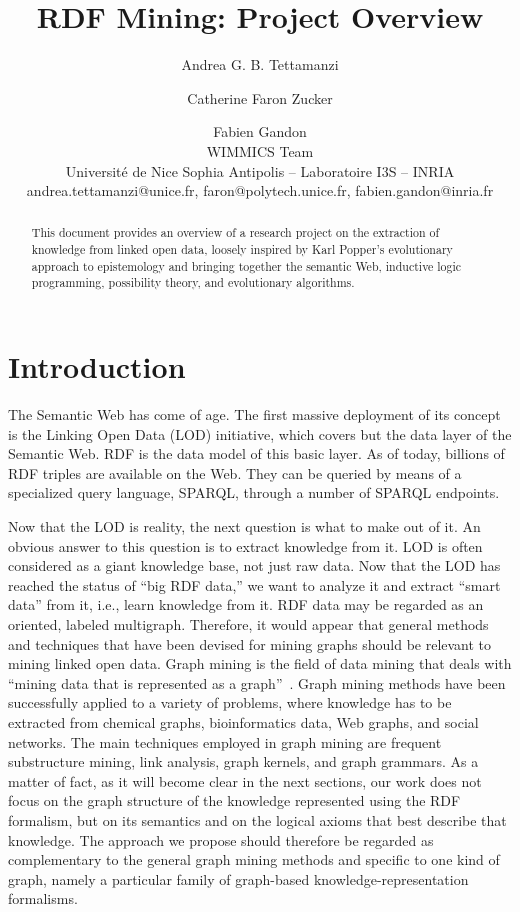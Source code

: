 \documentclass[a4paper]{article}
\title{RDF Mining: Project Overview}
\author{Andrea G. B. Tettamanzi \and Catherine Faron Zucker \and Fabien Gandon\\
  WIMMICS Team\\
  Universit\'e de Nice Sophia Antipolis -- Laboratoire I3S -- INRIA\\
  andrea.tettamanzi@unice.fr, faron@polytech.unice.fr, fabien.gandon@inria.fr}
\newcounter{ex}
\begin{document}
  \maketitle

\begin{abstract}
  This document provides an overview of a research project on the extraction
  of knowledge from linked open data, loosely inspired by Karl Popper's
  evolutionary approach to epistemology and bringing together the semantic Web,
  inductive logic programming, possibility theory, and evolutionary algorithms.
\end{abstract}

\section{Introduction}

The Semantic Web has come of age.
The first massive deployment of its concept is the Linking Open Data (LOD) initiative,
which covers but the data layer of the Semantic Web.
RDF is the data model of this basic layer.
As of today, billions of RDF triples are available on the Web. They can be queried
by means of a specialized query language, SPARQL, through a number of SPARQL endpoints.

Now that the LOD is reality, the next question is what to make out of it.
An obvious answer to this question is to extract knowledge from it.
LOD is often considered as a giant knowledge base, not just raw data.
Now that the LOD has reached the status of ``big RDF data,'' we want to analyze
it and extract ``smart data'' from it, i.e., learn knowledge from it.
RDF data may be regarded as an oriented, labeled multigraph.
Therefore, it would appear that general methods and techniques that have been devised
for mining graphs should be relevant to mining linked open data.
Graph mining is the field of data mining that deals with
``mining data that is represented as a graph''~\cite{CookHolder2006}.
Graph mining methods have been successfully applied to a variety of problems, where
knowledge has to be extracted from chemical graphs, bioinformatics data,
Web graphs, and social networks. The main techniques employed in graph mining
are frequent substructure mining, link analysis, graph kernels, and graph grammars.
As a matter of fact, as it will become clear in the next sections,
our work does not focus on the graph structure of the knowledge represented using
the RDF formalism, but on its semantics and on the logical axioms that best describe
that knowledge. The approach we propose should therefore be regarded as complementary
to the general graph mining methods and specific to one kind of graph, namely
a particular family of graph-based knowledge-representation formalisms.
\end{document}
